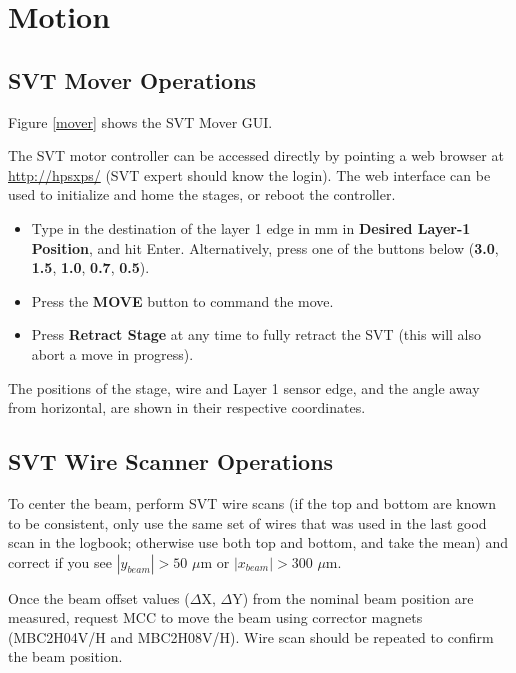 \documentclass[12pt]{report}
\begin{document}


\section{Motion}

\subsection{SVT Mover Operations}

Figure \ref{mover} shows the SVT Mover GUI.

The SVT motor controller can be accessed directly by pointing a web browser at \url{http://hpsxps/} (SVT expert should know the login). The web interface can be used to initialize and home the stages, or reboot the controller.

\begin{itemize}
\item
Type in the destination of the layer 1 edge in mm in \textbf{Desired Layer-1 Position}, and hit Enter. Alternatively, press one of the buttons below (\textbf{3.0}, \textbf{1.5}, \textbf{1.0}, \textbf{0.7}, \textbf{0.5}).
\item Press the \textbf{MOVE} button to command the move.
\item Press \textbf{Retract Stage} at any time to fully retract the SVT (this will also abort a move in progress).
\end{itemize}

The positions of the stage, wire and Layer 1 sensor edge, and the angle away from horizontal, are shown in their respective coordinates.

\subsection{SVT Wire Scanner Operations}
\label{sec:wirescan}

To center the beam, perform SVT wire scans (if the top and bottom are known to be consistent, only use the same set of wires that was used in the last good scan in the logbook; otherwise use both top and bottom, and take the mean) and correct if you see $|y_{beam}| > 50$ $\mu$m or $|x_{beam}| > 300$ $\mu$m.

Once the beam offset values ($\Delta$X, $\Delta$Y) from the nominal beam position are measured, request MCC to move the beam using corrector magnets (MBC2H04V/H and MBC2H08V/H). Wire scan should be repeated to confirm the beam position.
\end{document}
